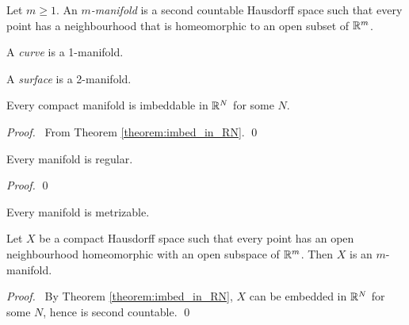 \begin{definition}[Manifold]
    Let $m \geq 1$. An \emph{$m$-manifold} is a second countable Hausdorff space such that every point has a neighbourhood that is
    homeomorphic to an open subset of $\mathbb{R}^m$.

    A \emph{curve} is a 1-manifold.

    A \emph{surface} is a 2-manifold.
\end{definition}

\begin{theorem}
    Every compact manifold is imbeddable in $\mathbb{R}^N$ for some $N$.
\end{theorem}

\begin{proof}
    \pf\ From Theorem \ref{theorem:imbed_in_RN}. \qed
\end{proof}

\begin{proposition}
    Every manifold is regular.
\end{proposition}

\begin{proof}
    \pf
    \qed
\end{proof}

\begin{corollary}
    Every manifold is metrizable.
\end{corollary}

\begin{proposition}
    Let $X$ be a compact Hausdorff space such that every point has an open neighbourhood homeomorphic with an open subspace of $\mathbb{R}^m$.
    Then $X$ is an $m$-manifold.
\end{proposition}

\begin{proof}
    \pf\ By Theorem \ref{theorem:imbed_in_RN}, $X$ can be embedded in $\mathbb{R}^N$ for some $N$, hence is second countable. \qed
\end{proof}